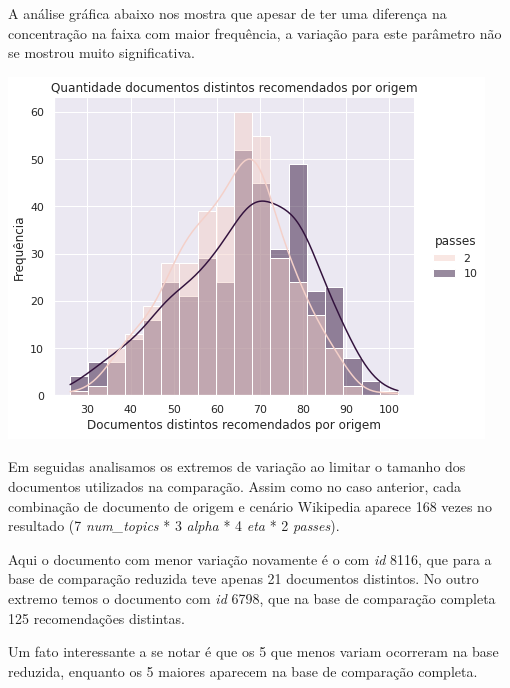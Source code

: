 A análise gráfica abaixo nos mostra que apesar de ter uma diferença na concentração na faixa com maior frequência, a variação para este parâmetro 
não se mostrou muito significativa.

\includegraphics[scale=0.7]{resultados/resources/distribuicao_semelhantes_distintos_passes.png}

Em seguidas analisamos os extremos de variação ao limitar o tamanho dos documentos utilizados na comparação.
Assim como no caso anterior, cada combinação de documento de origem e cenário Wikipedia aparece 168 vezes no resultado (7 \textit{num\_topics} * 3 \textit{alpha} * 4 \textit{eta} * 2 \textit{passes}).

Aqui o documento com menor variação novamente é o com \textit{id} 8116, que para a base de comparação reduzida teve apenas 21 documentos distintos. 
No outro extremo temos o documento com \textit{id} 6798, que na base de comparação completa 125 recomendações distintas.

Um fato interessante a se notar é que os 5 que menos variam ocorreram na base reduzida, enquanto os 5 maiores aparecem na base de comparação completa.

